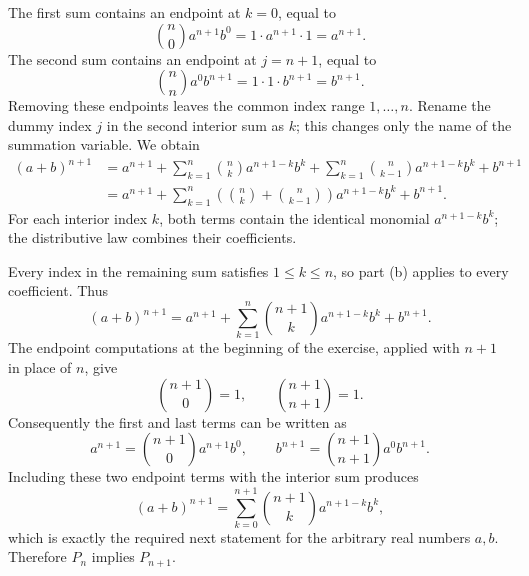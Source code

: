 The first sum contains an endpoint at $k=0$, equal to
\[
 \binom n0 a^{n+1}b^0=1\cdot a^{n+1}\cdot1=a^{n+1}.
\]
The second sum contains an endpoint at $j=n+1$, equal to
\[
 \binom nn a^0b^{n+1}=1\cdot1\cdot b^{n+1}=b^{n+1}.
\]
Removing these endpoints leaves the common index range $1,\ldots,n$.
Rename the dummy index $j$ in the second interior sum as $k$; this
changes only the name of the summation variable. We obtain
\begin{align*}
 (a+b)^{n+1}
 &=a^{n+1}
  +\sum_{k=1}^{n}\binom nk a^{n+1-k}b^k
  +\sum_{k=1}^{n}\binom n{k-1}a^{n+1-k}b^k
  +b^{n+1}\\
 &=a^{n+1}
  +\sum_{k=1}^{n}
     \left(\binom nk+\binom n{k-1}\right)a^{n+1-k}b^k
  +b^{n+1}.
\end{align*}
For each interior index $k$, both terms contain the identical monomial
$a^{n+1-k}b^k$; the distributive law combines their coefficients.

Every index in the remaining sum satisfies $1\leq k\leq n$, so
part (b) applies to every coefficient. Thus
\[
 (a+b)^{n+1}
 =a^{n+1}
  +\sum_{k=1}^{n}\binom{n+1}{k}a^{n+1-k}b^k
  +b^{n+1}.
\]
The endpoint computations at the beginning of the exercise, applied
with $n+1$ in place of $n$, give
\[
 \binom{n+1}{0}=1,
 \qquad
 \binom{n+1}{n+1}=1.
\]
Consequently the first and last terms can be written as
\[
 a^{n+1}=\binom{n+1}{0}a^{n+1}b^0,
 \qquad
 b^{n+1}=\binom{n+1}{n+1}a^0b^{n+1}.
\]
Including these two endpoint terms with the interior sum produces
\[
 (a+b)^{n+1}
 =\sum_{k=0}^{n+1}\binom{n+1}{k}a^{n+1-k}b^k,
\]
which is exactly the required next statement for the arbitrary real
numbers $a,b$. Therefore $P_n$ implies $P_{n+1}$.

